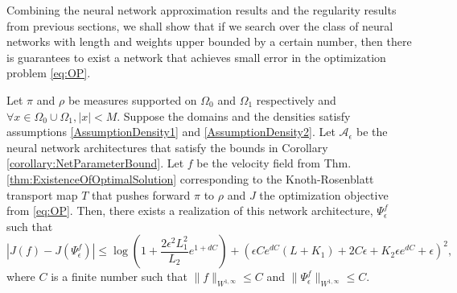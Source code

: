 Combining the neural network approximation results and the regularity results from previous sections, we shall show that if we search over the class of neural networks with length and weights upper bounded by a certain number, then there is guarantees to exist a network that achieves small error in the optimization problem \ref{eq:OP}.
\begin{theorem}
Let $\pi$ and $\rho$ be measures supported on $\Omega_0$ and $\Omega_1$ respectively and $\forall x\in \Omega_0\cup\Omega_1, |x| < M$. Suppose the domains and the densities satisfy assumptions \ref{AssumptionDensity1} and \ref{AssumptionDensity2}. Let $\mathcal{A}_\epsilon$ be the neural network architectures that satisfy the bounds in Corollary \ref{corollary:NetParameterBound}. Let $f$ be the velocity field from Thm.\ref{thm:ExistenceOfOptimalSolution} corresponding to the Knoth-Rosenblatt transport map $T$ that pushes forward $\pi$ to $\rho$ and $J$ the optimization objective from \ref{eq:OP}. Then, there exists a realization of this network architecture, $\Psi^f_\epsilon$ such that 
$$|J(f) - J(\Psi^f_\epsilon)| \leq \log\left(1+\frac{2\epsilon^2L_1^2}{L_2}e^{1 + dC} \right) + \left(\epsilon Ce^{dC}(L+ K_1) + 2C\epsilon + K_2\epsilon e^{dC} + \epsilon\right)^2,$$
where $C$ is a finite number such that $\|f\|_{W^{1,\infty}} \leq C$ and $\|\Psi^f_\epsilon\|_{W^{1,\infty}} \leq C$. 

\end{theorem}
